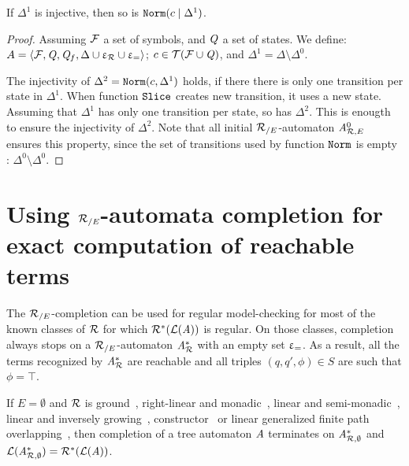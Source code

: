  \begin{lemma}
   If $\Delta^1$ is injective, then so is $\mathtt{Norm}(c \; | \; \Delta^1)$.
 \end{lemma}
 
 \begin{proof}
   Assuming $\mathcal{F}$ a set of symbols, and $\mathit Q$ a set of states. We define: $A = \langle \mathcal{F}, \mathit Q, \mathit Q_f, \Delta \cup \upvarepsilon_{\mathcal R} \cup \upvarepsilon_{=}\rangle$;
   $c \in \mathcal{ T(F \cup \mathit Q)}$, and $\Delta^1 = \Delta \setminus \Delta^0$.
   
   The injectivity of $\Delta^2 = \mathtt{Norm}(c, \Delta^1)$ holds, if there there is only one transition per state in $\Delta^1$.
   When function $\mathtt{Slice}$ creates new transition, it uses a new state.
   Assuming that $\Delta^1$ has only one transition per state, so has $\Delta^2$.
   This is enougth to ensure the injectivity of $\Delta^2$.
   Note that all initial ${\mathcal R_{/E}}$-automaton ${\it A}_{\mathcal R,E}^0$ ensures this property, since the set of transitions used 
   by function $\mathtt{Norm}$ is empty : $\Delta^0 \setminus \Delta^0$.
   
\end{proof}


\section{Using ${\mathcal R_{/E}}$-automata completion for exact computation of reachable terms}
\label{sec:exact}
The ${\mathcal R_{/E}}$-completion can be used for regular model-checking for most of the
known classes of $\mathcal R$ for which $\mathcal R^*(\mathcal{L}(\mathit A))$ is regular. On those classes,
completion always stops on a ${\mathcal R_{/E}}$-automaton ${\it A}_{\mathcal R}^*$ with an empty set $\upvarepsilon_{=}$. As
a result, all the terms recognized by ${\it A}_{\mathcal R}^*$ are reachable and all triples
$(q,q',\phi)\in S$ are such that $\phi=\top$.

\begin{theorem}
\label{thm:regular}
  If $E=\emptyset$ and $\mathcal R$ is
  ground~\cite{pDauchetTison-LICS90,pBrainerd-IC69}, right-linear and
  monadic~\cite{pSalomaa88}, linear and
  semi-monadic~\cite{pCoquideDauchetGV-FCT89}, linear and inversely
  growing~\cite{pJacquemard-RTA96}, constructor~\cite{pRety-LPAR99} or linear generalized finite path
  overlapping~\cite{Takai-RTA04}, then completion of a tree automaton $\mathit A$
  terminates on $\mathit A_{\mathcal R,\emptyset}^*$ and $\mathcal{L}(\mathit A_{\mathcal R,\emptyset}^*)=\mathcal R^*(\mathcal{L}(\mathit A))$.
\end{theorem}

